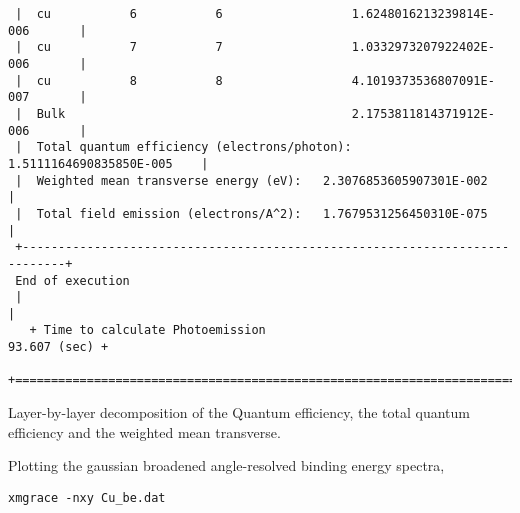\documentclass[a4paper,11pt,twoside]{book}
\begin{document}
\begin{enumerate}
\begin{verbatim}
 |  cu           6           6                  1.6248016213239814E-006       |
 |  cu           7           7                  1.0332973207922402E-006       |
 |  cu           8           8                  4.1019373536807091E-007       |
 |  Bulk                                        2.1753811814371912E-006       |
 |  Total quantum efficiency (electrons/photon):   1.5111164690835850E-005    |
 |  Weighted mean transverse energy (eV):   2.3076853605907301E-002           |
 |  Total field emission (electrons/A^2):   1.7679531256450310E-075           |
 +----------------------------------------------------------------------------+
 End of execution
 |                                                                            |
   + Time to calculate Photoemission                             93.607 (sec) +
 +============================================================================+
\end{verbatim}

Layer-by-layer decomposition of the Quantum efficiency, the total quantum efficiency and the weighted mean transverse.

\end{enumerate}

Plotting the gaussian broadened angle-resolved binding energy spectra,

\verb#xmgrace -nxy Cu_be.dat#
\end{document}
